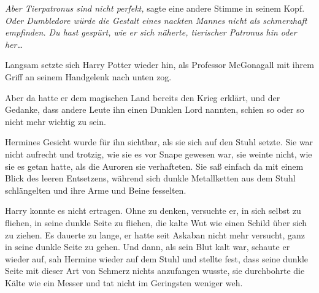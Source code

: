 \emph{Aber Tierpatronus sind nicht perfekt,} sagte eine andere Stimme in seinem Kopf. \emph{Oder Dumbledore würde die Gestalt eines nackten Mannes nicht als schmerzhaft empfinden. Du hast gespürt, wie er sich näherte, tierischer Patronus hin oder her…}

Langsam setzte sich Harry Potter wieder hin, als Professor McGonagall mit ihrem Griff an seinem Handgelenk nach unten zog.

Aber da hatte er dem magischen Land bereits den Krieg erklärt, und der Gedanke, dass andere Leute ihn einen Dunklen Lord nannten, schien so oder so nicht mehr wichtig zu sein.

Hermines Gesicht wurde für ihn sichtbar, als sie sich auf den Stuhl setzte. Sie war nicht aufrecht und trotzig, wie sie es vor Snape gewesen war, sie weinte nicht, wie sie es getan hatte, als die Auroren sie verhafteten. Sie saß einfach da mit einem Blick des leeren Entsetzens, während sich dunkle Metallketten aus dem Stuhl schlängelten und ihre Arme und Beine fesselten.

Harry konnte es nicht ertragen. Ohne zu denken, versuchte er, in sich selbst zu fliehen, in seine dunkle Seite zu fliehen, die kalte Wut wie einen Schild über sich zu ziehen. Es dauerte zu lange, er hatte seit Askaban nicht mehr versucht, ganz in seine dunkle Seite zu gehen. Und dann, als sein Blut kalt war, schaute er wieder auf, sah Hermine wieder auf dem Stuhl und stellte fest, dass seine dunkle Seite mit dieser Art von Schmerz nichts anzufangen wusste, sie durchbohrte die Kälte wie ein Messer und tat nicht im Geringsten weniger weh.

